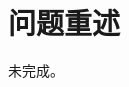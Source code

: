 \documentclass{article}
\begin{document}
\begin{abstract}只有摘要，没有正文结构。\end{abstract}
\section{问题重述}未完成。
\end{document}
